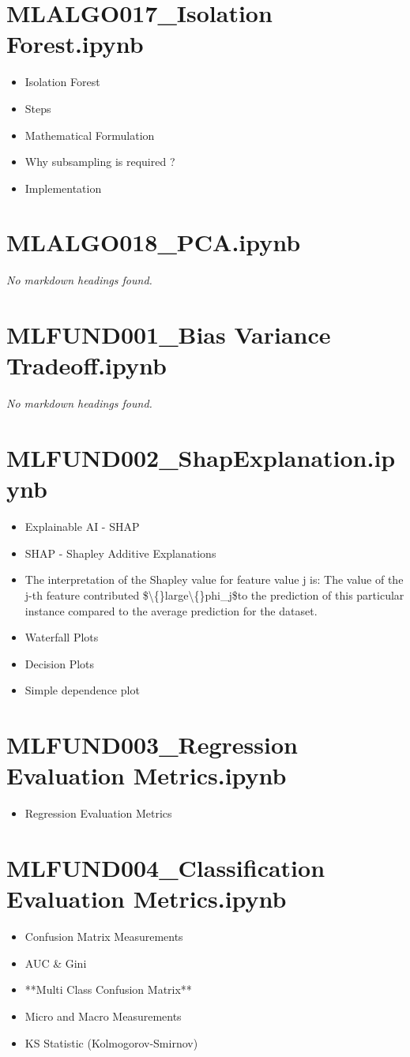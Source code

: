 \documentclass[11pt]{article}
\begin{document}
\section*{MLALGO017\_Isolation Forest.ipynb}
\begin{itemize}
\item Isolation Forest
\item Steps
\item Mathematical Formulation
\item Why subsampling is required ?
\item Implementation
\end{itemize}
\section*{MLALGO018\_PCA.ipynb}
\textit{No markdown headings found.}
\section*{MLFUND001\_Bias Variance Tradeoff.ipynb}
\textit{No markdown headings found.}
\section*{MLFUND002\_ShapExplanation.ipynb}
\begin{itemize}
\item Explainable AI - SHAP
\item SHAP - Shapley Additive Explanations
\item The interpretation of the Shapley value for feature value j is: The value of the j-th feature contributed \$\textbackslash\{\}large\textbackslash\{\}phi\_j\$to the prediction of this particular instance compared to the average prediction for the dataset.
\item Waterfall Plots
\item Decision Plots
\item Simple dependence plot
\end{itemize}
\section*{MLFUND003\_Regression Evaluation Metrics.ipynb}
\begin{itemize}
\item Regression Evaluation Metrics
\end{itemize}
\section*{MLFUND004\_Classification Evaluation Metrics.ipynb}
\begin{itemize}
\item Confusion Matrix Measurements
\item AUC \& Gini
\item **Multi Class Confusion Matrix**
\item Micro and Macro Measurements
\item KS Statistic (Kolmogorov-Smirnov)
\end{itemize}
\end{document}
